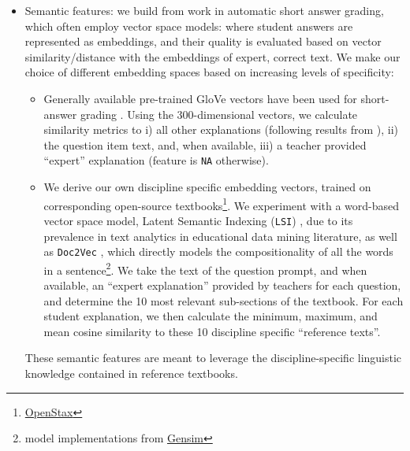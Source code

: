 \documentclass[notitlepage,12pt]{jedm}
\begin{document}
\begin{itemize}
	\item Semantic features: we build from work in automatic short answer 
	grading, which often employ vector space models: where student answers are 
	represented as embeddings, and their quality is evaluated based on vector 
	similarity/distance with the embeddings of expert, correct text.
	We make our choice of different embedding spaces based on increasing levels 
	of specificity:  
	\begin{itemize}
		\item Generally available pre-trained GloVe 
		vectors \cite{pennington_glove:_2014} have been used for short-answer 
		grading \cite{magooda_vector_2016,riordan_investigating_2017}. 
		Using the 300-dimensional vectors, we calculate similarity metrics to 
		i) all other explanations (following results from 
		), 
		ii) the question item text, and, when available, 
		iii) a teacher provided ``expert'' explanation (feature is \verb|NA| 
		otherwise).
		\item We derive our own discipline specific embedding vectors, trained 
		on corresponding open-source 
		textbooks\footnote{\href{https://openstax.org}{OpenStax}}. 
		We experiment with a word-based vector space model, Latent Semantic 
		Indexing (\verb|LSI|) \cite{deerwester_indexing_1990}, due to its 
		prevalence in text analytics in educational data mining literature, as 
		well as \verb|Doc2Vec| \cite{le_distributed_2014}, which directly 
		models the compositionality of all the words in a 
		sentence\footnote{model implementations from 
		\href{https://radimrehurek.com/gensim/index.html}{Gensim}}.
		We take the text of the question prompt, and when available, an 
		``expert explanation'' provided by teachers for each question, and 
		determine the 10 most relevant sub-sections of the textbook.
		For each student explanation, we then calculate the minimum, maximum, 
		and mean cosine similarity to these 10 discipline specific ``reference 
		texts''.
	\end{itemize}

	These semantic features are meant to leverage the discipline-specific 
	linguistic knowledge contained in reference textbooks.  
		
	

\end{itemize}
\end{document}
